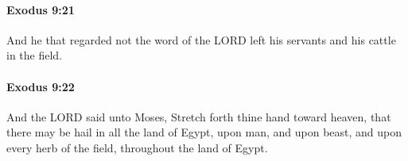 		\paragraph{Exodus 9:21} %
			\label{EXODUS-9-21}

			And he that regarded not the word of the LORD left his servants and his cattle in the field.


		\paragraph{Exodus 9:22} %
			\label{EXODUS-9-22}

			And the LORD said unto Moses, Stretch forth thine hand toward heaven, that there may be hail in all the land of Egypt, upon man, and upon beast, and upon every herb of the field, throughout the land of Egypt.


